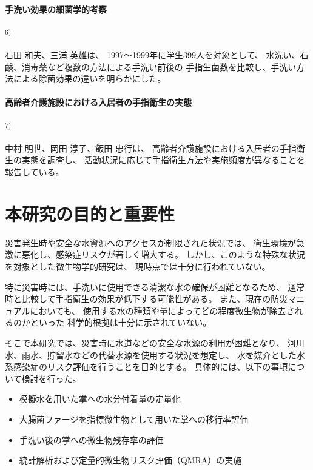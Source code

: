 \paragraph{手洗い効果の細菌学的考察}\textsuperscript{6)}

石田 和夫、三浦 英雄は、
1997～1999年に学生399人を対象として、
水洗い、石鹸、消毒薬など複数の方法による手洗い前後の
手指生菌数を比較し、手洗い方法による除菌効果の違いを明らかにした。

\paragraph{高齢者介護施設における入居者の手指衛生の実態}\textsuperscript{7)}

中村 明世、岡田 淳子、飯田 忠行は、
高齢者介護施設における入居者の手指衛生の実態を調査し、
活動状況に応じて手指衛生方法や実施頻度が異なることを報告している。


\section{本研究の目的と重要性}

災害発生時や安全な水資源へのアクセスが制限された状況では、
衛生環境が急激に悪化し、感染症リスクが著しく増大する。
しかし、このような特殊な状況を対象とした微生物学的研究は、
現時点では十分に行われていない。

特に災害時には、手洗いに使用できる清潔な水の確保が困難となるため、
通常時と比較して手指衛生の効果が低下する可能性がある。
また、現在の防災マニュアルにおいても、
使用する水の種類や量によってどの程度微生物が除去されるのかといった
科学的根拠は十分に示されていない。

そこで本研究では、災害時に水道などの安全な水源の利用が困難となり、
河川水、雨水、貯留水などの代替水源を使用する状況を想定し、
水を媒介とした水系感染症のリスク評価を行うことを目的とする。
具体的には、以下の事項について検討を行った。

\begin{itemize}
  \item 模擬水を用いた掌への水分付着量の定量化
  \item 大腸菌ファージを指標微生物として用いた掌への移行率評価
  \item 手洗い後の掌への微生物残存率の評価
  \item 統計解析および定量的微生物リスク評価（QMRA）の実施
\end{itemize}

